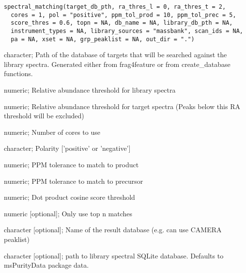 \documentclass[letterpaper]{book}
\begin{document}
%
\begin{Usage}
\begin{verbatim}
spectral_matching(target_db_pth, ra_thres_l = 0, ra_thres_t = 2,
  cores = 1, pol = "positive", ppm_tol_prod = 10, ppm_tol_prec = 5,
  score_thres = 0.6, topn = NA, db_name = NA, library_db_pth = NA,
  instrument_types = NA, library_sources = "massbank", scan_ids = NA,
  pa = NA, xset = NA, grp_peaklist = NA, out_dir = ".")
\end{verbatim}
\end{Usage}
%
\begin{Arguments}
\begin{ldescription}
\item[\code{target\_db\_pth}] character; Path of the database of targets that will be searched against the library spectra. Generated
either from frag4feature or from create\_database functions.

\item[\code{ra\_thres\_l}] numeric; Relative abundance threshold for library spectra

\item[\code{ra\_thres\_t}] numeric; Relative abundance threshold for target spectra
(Peaks below this RA threshold will be excluded)

\item[\code{cores}] numeric; Number of cores to use

\item[\code{pol}] character; Polarity ['positive' or 'negative']

\item[\code{ppm\_tol\_prod}] numeric; PPM tolerance to match to product

\item[\code{ppm\_tol\_prec}] numeric; PPM tolerance to match to precursor

\item[\code{score\_thres}] numeric; Dot product cosine score threshold

\item[\code{topn}] numeric [optional]; Only use top n matches

\item[\code{db\_name}] character [optional]; Name of the result database
(e.g. can use CAMERA peaklist)

\item[\code{library\_db\_pth}] character [optional]; path to library spectral SQLite database.
Defaults to msPurityData package data.


\end{ldescription}
\end{Arguments}
\end{document}
